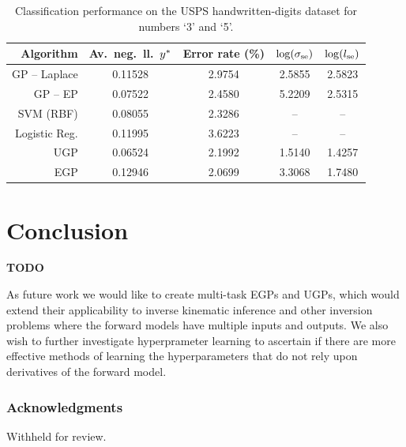 \documentclass{article} %
\begin{document}
\begin{table}[tb]
    \centering
    \small
    \caption[]{Classification performance on the USPS handwritten-digits
        dataset for numbers `3' and `5'.}
    \begin{tabular}{r| c c c c}
        Algorithm & Av.\ neg.\ ll.\ $y^{*}$ & Error rate (\%) 
            & $\log\!\left({\sigma_\text{se}}\right)$ & $\log\!\left({l_\text{se}}\right)$ \\
        \toprule
        GP -- Laplace & 0.11528 & 2.9754 & 2.5855 & 2.5823 \\
        GP -- EP & 0.07522 & 2.4580 & 5.2209 & 2.5315 \\
        SVM (RBF) & 0.08055 & 2.3286 & -- & -- \\
        Logistic Reg. & 0.11995 & 3.6223 & -- & -- \\
        \midrule
        UGP & 0.06524 & 2.1992 & 1.5140 & 1.4257 \\
        EGP & 0.12946 & 2.0699 & 3.3068 & 1.7480 \\
        \bottomrule
    \end{tabular}
    \label{tab:class}
\end{table}


\section{Conclusion}

\textbf{TODO}

As future work we would like to create multi-task EGPs and UGPs, which would
extend their applicability to inverse kinematic inference and other inversion
problems where the forward models have multiple inputs and outputs. We also
wish to further investigate hyperprameter learning to ascertain if there are
more effective methods of learning the hyperparameters that do not rely upon
derivatives of the forward model. 


\subsubsection*{Acknowledgments}

Withheld for review.



\end{document}
